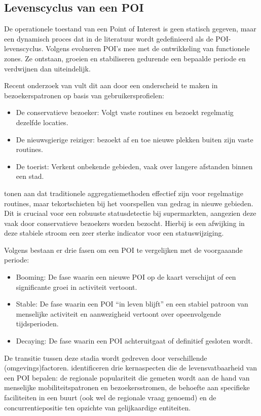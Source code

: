 \subsection{Levenscyclus van een POI}
\label{sec:Levenscyclus}

De operationele toestand van een Point of Interest is geen statisch gegeven, maar een dynamisch proces dat in de literatuur wordt gedefinieerd als de POI-levenscyclus. Volgens \textcite{Lu2020} evolueren POI's mee met de ontwikkeling van functionele zones. Ze ontstaan, groeien en stabiliseren gedurende een bepaalde periode en verdwijnen dan uiteindelijk.

Recent onderzoek van \textcite{Qin2023} vult dit aan door een onderscheid te maken in bezoekerspatronen op basis van gebruikersprofielen:
\begin{itemize}
    \item De conservatieve bezoeker: Volgt vaste routines en bezoekt regelmatig dezelfde locaties.
    \item De nieuwsgierige reiziger: bezoekt af en toe nieuwe plekken buiten zijn vaste routines.
    \item De toerist: Verkent onbekende gebieden, vaak over langere afstanden binnen een stad.
\end{itemize}

\textcite{Qin2023} tonen aan dat traditionele aggregatiemethoden effectief zijn voor regelmatige routines, maar tekortschieten bij het voorspellen van gedrag in nieuwe gebieden. Dit is cruciaal voor een robuuste statusdetectie bij supermarkten, aangezien deze vaak door conservatieve bezoekers worden bezocht. Hierbij is een afwijking in deze stabiele stroom een zeer sterke indicator voor een statuswijziging.

Volgens \textcite{Lu2020} bestaan er drie fasen om een POI te vergelijken met de voorgaaande periode:  
\begin{itemize}
    \item Booming: De fase waarin een nieuwe POI op de kaart verschijnt of een significante groei in activiteit vertoont.
    \item Stable: De fase waarin een POI ``in leven blijft'' en een stabiel patroon van menselijke activiteit en aanwezigheid vertoont over opeenvolgende tijdsperioden.
    \item Decaying: De fase waarin een POI achteruitgaat of definitief gesloten wordt. 
\end{itemize}

De transitie tussen deze stadia wordt gedreven door verschillende (omgevings)factoren. \textcite{Lu2020} identificeren drie kernaspecten die de levensvatbaarheid van een POI bepalen: de regionale populariteit die gemeten wordt aan de hand van menselijke mobiliteitspatronen en bezoekersstromen, de behoefte aan specifieke faciliteiten in een buurt (ook wel de regionale vraag genoemd) en de concurrentiepositie ten opzichte van gelijkaardige entiteiten.

